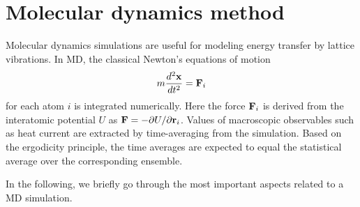 \section{Molecular dynamics method}

Molecular dynamics simulations are useful for modeling energy transfer by lattice vibrations. In MD, the classical Newton's equations of motion 
\begin{equation}
 m \frac{d^2 \mathbf{x}}{dt^2} = \mathbf{F}_i 
\end{equation}
for each atom $i$ is integrated numerically. Here the force $\mathbf{F}_i$ is derived from the interatomic potential $U$ as $\mathbf{F}=-\partial U/\partial \mathbf{r}_i$. Values of macroscopic observables such as heat current are extracted by time-averaging from the simulation. Based on the ergodicity principle, the time averages are expected to equal the statistical average over the corresponding ensemble. 


In the following, we briefly go through the most important aspects related to a MD simulation.


